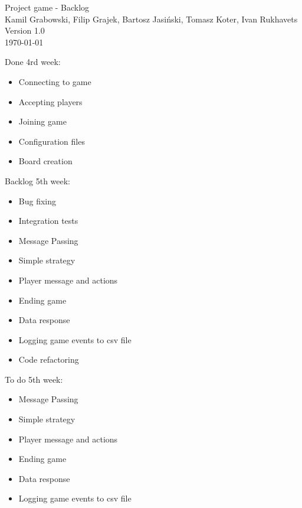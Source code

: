\documentclass[11pt,a4paper]{article}
\begin{document}
\begin{titlepage}
\centering
\huge Project game - Backlog \\
\vspace{1.5cm}
\large Kamil Grabowski, Filip Grajek, Bartosz Jasiński, Tomasz Koter, Ivan Rukhavets \\
\vspace{1.0cm}
Version 1.0 \\
\vspace{1.0cm}
\today
\end{titlepage}

Done 4rd week:
\begin{itemize}

\item Connecting to game
\item Accepting players
\item Joining game
\item Configuration files
\item Board creation
\end{itemize}


Backlog 5th week:
\begin{itemize}
\item Bug fixing
\item Integration tests
\item Message Passing
\item Simple strategy
\item Player message and actions
\item Ending game
\item Data response
\item Logging game events to csv file
\item Code refactoring
\end{itemize}


To do 5th week:
\begin{itemize}
\item Message Passing
\item Simple strategy
\item Player message and actions
\item Ending game
\item Data response
\item Logging game events to csv file
\end{itemize}
 
\end{document}
